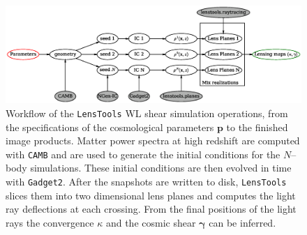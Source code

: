 \documentclass[reprint,aps,prd,superscriptaddress,showkeys,showpacs]{revtex4-1}
\newcommand{\bb}[1]{\mathbf{#1}}
\newcommand{\ttt}[1]{\texttt{#1}}
\newcommand{\LT}{\texttt{LensTools} }
\begin{document}
\begin{figure}
\includegraphics[scale=0.6]{Figures/flow.eps}
\caption{Workflow of the \LT WL shear simulation operations, from the specifications of the cosmological parameters $\bb{p}$ to the finished image products. Matter power spectra at high redshift are computed with \ttt{CAMB} and are used to generate the initial conditions for the $N$--body simulations. These initial conditions are then evolved in time with \ttt{Gadget2}. After the snapshots are written to disk, \LT slices them into two dimensional lens planes and computes the light ray deflections at each crossing. From the final positions of the light rays the convergence $\kappa$ and the cosmic shear $\pmb{\gamma}$ can be inferred.}
\label{pipescheme}
\end{figure}
\end{document}
